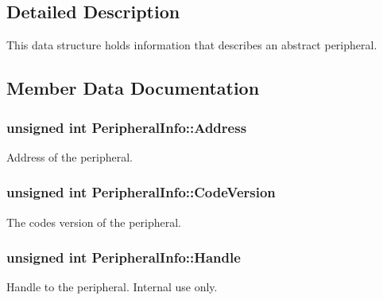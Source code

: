 \subsection{Detailed Description}
This data structure holds information that describes an abstract peripheral. 

\subsection{Member Data Documentation}
\subsubsection[{\texorpdfstring{Address}{Address}}]{\setlength{\rightskip}{0pt plus 5cm}unsigned int Peripheral\+Info\+::\+Address}\hypertarget{struct_peripheral_info_a18255b4f0485ada8f5658e30a6c8486e}{}\label{struct_peripheral_info_a18255b4f0485ada8f5658e30a6c8486e}


Address of the peripheral. 

\subsubsection[{\texorpdfstring{Code\+Version}{CodeVersion}}]{\setlength{\rightskip}{0pt plus 5cm}unsigned int Peripheral\+Info\+::\+Code\+Version}\hypertarget{struct_peripheral_info_a871b1f912f52fd20a1e8bd120ed81422}{}\label{struct_peripheral_info_a871b1f912f52fd20a1e8bd120ed81422}


The code\textquotesingle{}s version of the peripheral. 

\subsubsection[{\texorpdfstring{Handle}{Handle}}]{\setlength{\rightskip}{0pt plus 5cm}unsigned int Peripheral\+Info\+::\+Handle}\hypertarget{struct_peripheral_info_ad63ba012f47f06ba9eb5baa1e5c49cfb}{}\label{struct_peripheral_info_ad63ba012f47f06ba9eb5baa1e5c49cfb}


Handle to the peripheral. Internal use only. 

